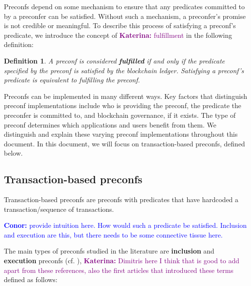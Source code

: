 \documentclass[a4paper]{article}
\theoremstyle{boldstyle}
\newtheorem{definitionx}{Definition}
\newenvironment{definition}
  {\begin{defopenboxq}\begin{definitionx}}
  {\end{definitionx}\end{defopenboxq}}
\newcommand{\cm}[1]{\textcolor{blue}{\textbf{Conor:} #1}}
\newcommand{\ks}[1]{\textcolor{purple}{\textbf{Katerina:} #1}}
\begin{document}
         \par
         Preconfs depend on some mechanism to ensure that any predicates committed to by a preconfer can be satisfied. Without such a mechanism, a preconfer's promise is not credible or meaningful. To describe this process of satisfying a preconf's predicate, we introduce the concept of \ks{fulfillment} in the following definition:
     \begin{definition}\label{def:delivery}
    A preconf is considered \textbf{fulfilled }if and only if the predicate specified by the preconf is satisfied by the blockchain ledger. Satisfying a preconf's predicate is equivalent to fulfilling the preconf.
    \end{definition}
     Preconfs can be implemented in many different ways. Key factors that distinguish preconf implementations include who is providing the preconf, the predicate the preconfer is committed to, and blockchain governance, if it exists. The type of preconf determines which applications and users benefit from them.  We distinguish and explain these varying preconf implementations throughout this document. In this document, we will focus on transaction-based preconfs, defined below.
     

    \subsection{Transaction-based preconfs}
    Transaction-based preconfs are preconfs with predicates that have hardcoded a transaction/sequence of transactions. 
    
    \cm{provide intuition here. How would such a predicate be satisfied. Inclusion and execution are this, but there needs to be some connective tissue here.} 
    
    The main types of preconfs studied in the literature are \textbf{inclusion} and \textbf{execution} preconfs (cf. \cite{W:APricingModelforInclusionPreconfirmations,W:AnalysingExpectedProposerRevenuefromPreconfirmations}), \ks{Dimitris here I think that is good to add apart from these references, also the first articles that introduced these terms} defined as follows:   
    
\end{document}
